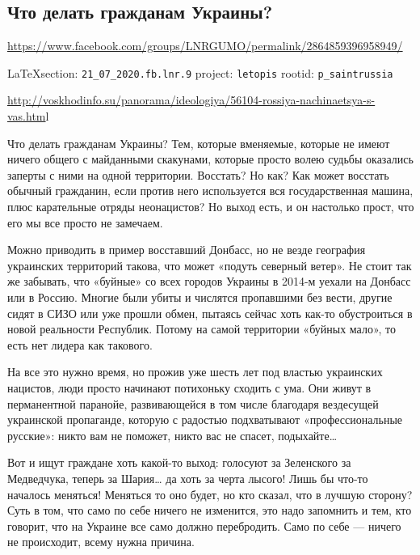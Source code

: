  
 
\subsection{Что делать гражданам Украины?}
\url{https://www.facebook.com/groups/LNRGUMO/permalink/2864859396958949/}
  
\vspace{0.5cm}
{\small\LaTeX section: \verb|21_07_2020.fb.lnr.9| project: \verb|letopis| rootid: \verb|p_saintrussia|}
\vspace{0.5cm}

\url{http://voskhodinfo.su/panorama/ideologiya/56104-rossiya-nachinaetsya-s-vas.htm}l

Что делать гражданам Украины? Тем, которые вменяемые, которые не имеют ничего
общего с майданными скакунами, которые просто волею судьбы оказались заперты с
ними на одной территории. Восстать? Но как? Как может восстать обычный
гражданин, если против него используется вся государственная машина, плюс
карательные отряды неонацистов? Но выход есть, и он настолько прост, что его мы
все просто не замечаем.

Можно приводить в пример восставший Донбасс, но не везде география украинских
территорий такова, что может «подуть северный ветер». Не стоит так же забывать,
что «буйные» со всех городов Украины в 2014-м уехали на Донбасс или в Россию.
Многие были убиты и числятся пропавшими без вести, другие сидят в СИЗО или уже
прошли обмен, пытаясь сейчас хоть как-то обустроиться в новой реальности
Республик. Потому на самой территории «буйных мало», то есть нет лидера как
такового.

На все это нужно время, но прожив уже шесть лет под властью украинских
нацистов, люди просто начинают потихоньку сходить с ума. Они живут в
перманентной паранойе, развивающейся в том числе благодаря вездесущей
украинской пропаганде, которую с радостью подхватывают «профессиональные
русские»: никто вам не поможет, никто вас не спасет, подыхайте…

Вот и ищут граждане хоть какой-то выход: голосуют за Зеленского за Медведчука,
теперь за Шария… да хоть за черта лысого! Лишь бы что-то началось меняться!
Меняться то оно будет, но кто сказал, что в лучшую сторону? Суть в том, что
само по себе ничего не изменится, это надо запомнить и тем, кто говорит, что на
Украине все само должно перебродить. Само по себе --- ничего не происходит, всему
нужна причина.

